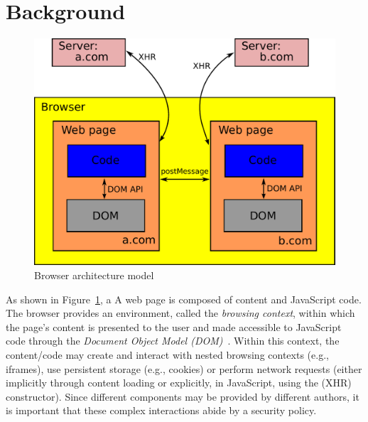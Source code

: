 \section{Background}
\label{sec:background}

%
\iffigures
\begin{figure}
\begin{center}
\includegraphics[scale=0.35]{setting.pdf}
\end{center}
\caption{\label{fig:browser-arch} Browser architecture model}
\end{figure}
As shown in Figure~\ref{fig:browser-arch}, a 
\else
A
\fi
web page is composed of
content and JavaScript code.
%
The browser provides an environment, called the \emph{browsing
context}, within which the page's content is presented to the user and
made accessible to JavaScript code through the \emph{Document Object
Model (DOM)}~\cite{html5}.
%
Within this context, the content/code may create and interact with
nested browsing contexts (e.g., iframes), use persistent storage
(e.g., cookies) or perform network requests (either implicitly through
content loading or explicitly, in JavaScript, using the \xhr{} (XHR)
constructor).
%
Since different components may be provided by different authors, it is
important that these complex interactions abide by a security policy.
 
